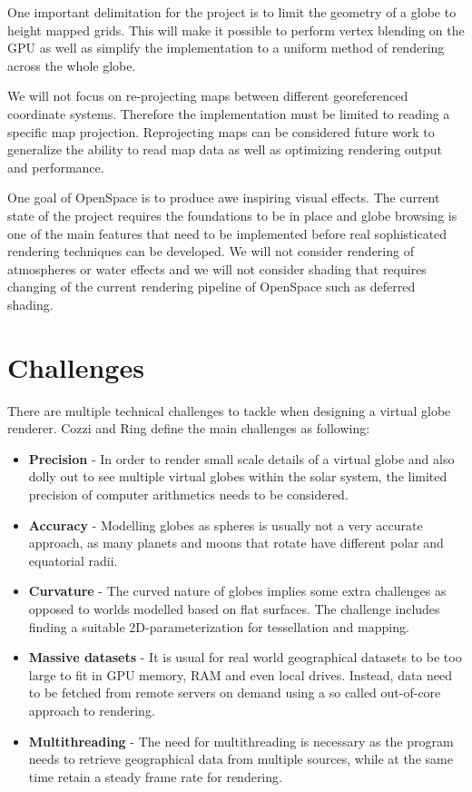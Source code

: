 One important delimitation for the project is to limit the geometry of a globe to height mapped grids. This will make it possible to perform vertex blending on the GPU as well as simplify the implementation to a uniform method of rendering across the whole globe.

We will not focus on re-projecting maps between different georeferenced coordinate systems. Therefore the implementation must be limited to reading a specific map projection. Reprojecting maps can be considered future work to generalize the ability to read map data as well as optimizing rendering output and performance.

One goal of OpenSpace is to produce awe inspiring visual effects. The current state of the project requires the foundations to be in place and globe browsing is one of the main features that need to be implemented before real sophisticated rendering techniques can be developed. We will not consider rendering of atmospheres or water effects and we will not consider shading that requires changing of the current rendering pipeline of OpenSpace such as deferred shading.

\section{Challenges}

There are multiple technical challenges to tackle when designing a virtual globe renderer. Cozzi and Ring \cite{cozzi11} define the main challenges as following:

\begin{itemize}

\item \textbf{Precision} - In order to render small scale details of a virtual globe and also dolly out to see multiple virtual globes within the solar system, the limited precision of computer arithmetics needs to be considered.
\item \textbf{Accuracy} - Modelling globes as spheres is usually not a very accurate approach, as many planets and moons that rotate have different polar and equatorial radii.
\item \textbf{Curvature} - The curved nature of globes implies some extra challenges as opposed to worlds modelled based on flat surfaces. The challenge includes finding a suitable 2D-parameterization for tessellation and mapping.
\item \textbf{Massive datasets} - It is usual for real world geographical datasets to be too large to fit in GPU memory, RAM and even local drives. Instead, data need to be fetched from remote servers on demand using a so called out-of-core approach to rendering.
\item \textbf{Multithreading} - The need for multithreading is necessary as the program needs to retrieve geographical data from multiple sources, while at the same time retain a steady frame rate for rendering.

\end{itemize}

